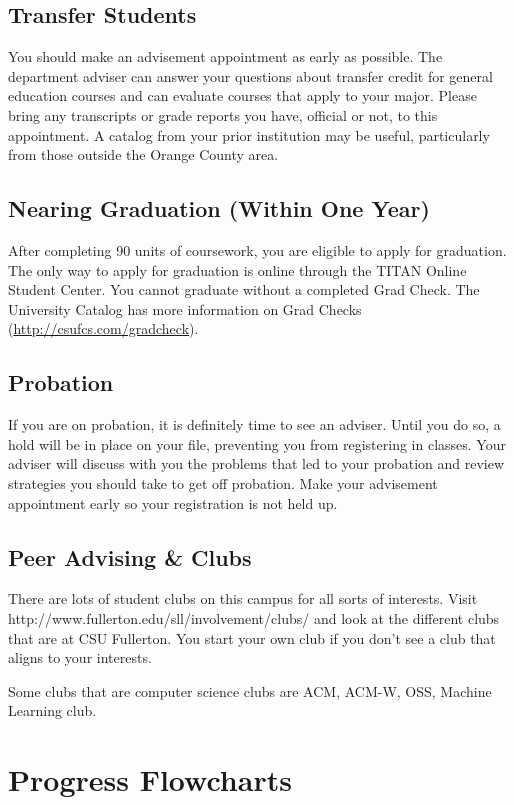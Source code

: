 \documentclass{book}
\newcommand{\shrunkurl}[1]{\url{http://csufcs.com/#1}}
\begin{document}
\section{Transfer Students}
You should make an advisement appointment as early as possible. The
department adviser can answer your questions about transfer credit for
general education courses and can evaluate courses that apply to your
major. Please bring any transcripts or grade reports you have,
official or not, to this appointment. A catalog from your prior
institution may be useful, particularly from those outside the Orange
County area.

\section{Nearing Graduation (Within One Year)}
After completing 90 units of coursework, you are eligible to apply for
graduation. The only way to apply for graduation is online through the
TITAN Online Student Center. You cannot graduate without a completed
Grad Check.  The University Catalog has more
information on Grad Checks (\shrunkurl{gradcheck}).

\section{Probation}
If you are on probation, it is definitely time to see an
adviser. Until you do so, a hold will be in place on your file,
preventing you from registering in classes. Your adviser will discuss
with you the problems that led to your probation and review strategies
you should take to get off probation. Make your advisement appointment
early so your registration is not held up.

\section{Peer Advising \& Clubs}
There are lots of student clubs on this campus for all sorts of
interests. Visit http://www.fullerton.edu/sll/involvement/clubs/ and
look at the different clubs that are at CSU Fullerton. You start your
own club if you don't see a club that aligns to your interests.

Some clubs that are computer science clubs are ACM, ACM-W, OSS,
Machine Learning club.

\chapter{Progress Flowcharts}
\end{document}

